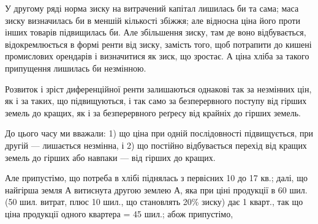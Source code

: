 У другому ряді норма зиску на витрачений капітал лишилась би та
сама; маса зиску визначилась би в меншій кількості збіжжя; але відносна ціна
його проти інших товарів підвищилась би. Але збільшення зиску, там де воно
відбувається, відокремлюється в формі ренти від зиску, замість того, щоб потрапити
до кишені промислових орендарів і визначитися як зиск, що зростає.
А ціна хліба за такого припущення лишилась би незмінною.

Розвиток і зріст диференційної ренти залишаються однакові так за незмінних
цін, як і за таких, що підвищуються, і так само за безперервного поступу
від гірших земель до кращих, як і за безперервного реґресу від крайніх
до гірших земель.

До цього часу ми вважали: 1) що ціна при одній послідовності підвищується,
при другій — лишається незмінна, і 2) що постійно відбувається перехід
від кращих земель до гірших або навпаки — від гірших до кращих.

Але припустімо, що потреба в хлібі піднялась з первісних 10 до 17 кв.;
далі, що найгірша земля А витиснута другою землею А, яка при ціні продукції
в 60 шил. (50 шил. витрат, плюс 10 шил., що становлять 20\% зиску) дає
1 кварт., так що ціна продукції одного квартера = 45 шил.; абож припустімо,
\parbreak{}  %
